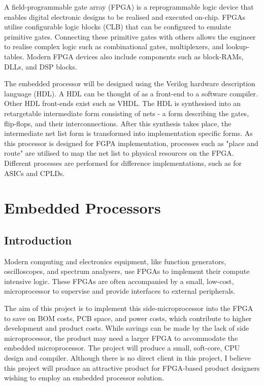 \documentclass[11pt,a4paper]{report}
\begin{document}
A field-programmable gate array (FPGA) is a reprogrammable logic device that enables digital electronic designs to be realised and executed on-chip. FPGAs utilise configurable logic blocks (CLB) that can be configured to emulate primitive gates. Connecting these primitive gates with others allows the engineer to realise complex logic such as combinational gates, multiplexers, and lookup-tables. Modern FPGA devices also include components such as block-RAMs, DLLs, and DSP blocks.

The embedded processor will be designed using the Verilog hardware description language (HDL). A HDL can be thought of as a front-end to a software compiler. Other HDL front-ends exist such as VHDL. The HDL is synthesised into an retargetable intermediate form consisting of nets - a form describing the gates, flip-flops, and their interconnections. After this synthesis takes place, the intermediate net list form is transformed into implementation specific forms. As this processor is designed for FGPA implementation, processes such as "place and route" are utilised to map the net list to physical resources on the FPGA. Different processes are performed for difference implementations, such as for ASICs and CPLDs.

\newpage
\chapter{Embedded Processors}
{\hypersetup{linkcolor=black}
\startcontents[chapters]
}

\section{Introduction}
Modern computing and electronics equipment, like function generators, oscilloscopes, and spectrum analysers, use FPGAs to implement their compute intensive logic. These FPGAs are often accompanied by a small, low-cost, microprocessor to supervise and provide interfaces to external peripherals.

The aim of this project is to implement this side-microprocessor into the FPGA to save on BOM costs, PCB  space,  and  power  costs,  which  contribute  to  higher  development  and  product  costs.  While  savings can  be  made  by  the  lack  of  side  microprocessor,  the  product  may  need  a  larger  FPGA  to  accommodate the embedded microprocessor.  The project will produce a small, soft-core, CPU design and compiler. Although there is no direct client in this project, I believe this project will produce an attractive product
for FPGA-based product designers wishing to employ an embedded processor solution.
\end{document}

